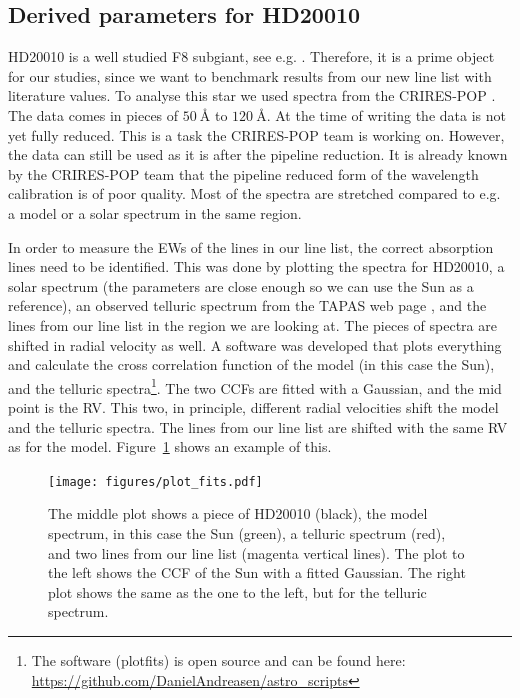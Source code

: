 \documentclass{aa}
\begin{document}
\subsection{Derived parameters for HD20010}
\label{sec:derived_parameters_of_hd20010}

HD20010 is a well studied F8 subgiant, see e.g.
\cite{Mortier2013,Lebzelter2012}. Therefore, it is a prime object for
our studies, since we want to benchmark results from our new line list
with literature values. To analyse this star we used spectra from
the CRIRES-POP \citep{Lebzelter2012}. The data comes in pieces of
$\SI{50}{\angstrom}$ to $\SI{120}{\angstrom}$. At the time of writing
the data is not yet fully reduced. This is a task the CRIRES-POP team
is working on. However, the data can still be used as it is after the
pipeline reduction. It is already known by the CRIRES-POP team that the
pipeline reduced form of the wavelength calibration is of poor quality.
Most of the spectra are stretched compared to e.g. a model or a solar
spectrum in the same region.

In order to measure the EWs of the lines in our line list, the correct
absorption lines need to be identified. This was done by plotting
the spectra for HD20010, a solar spectrum (the parameters are close
enough so we can use the Sun as a reference), an observed telluric
spectrum from the TAPAS web page \citep{Bertaux2014}, and the lines from our
line list in the region we are looking at. The pieces of spectra are
shifted in radial velocity as well. A software was developed that plots
everything and calculate the cross correlation function of the model
(in this case the Sun), and the telluric spectra\footnote{The software
(plot\textunderscore{}fits) is open source and can be found here:
\url{https://github.com/DanielAndreasen/astro_scripts}}. The two CCFs
are fitted with a Gaussian, and the mid point is the RV. This two, in
principle, different radial velocities shift the model and the telluric
spectra. The lines from our line list are shifted with the same RV as for
the model. Figure~\ref{fig:plot_fits} shows an example of this.

\begin{figure}[tbp!]
    \centering
    \texttt{[image: figures/plot\_fits.pdf]}
    \caption{The middle plot shows a piece of HD20010 (black), the model
    spectrum, in this case the Sun (green), a telluric spectrum (red), and two
    lines from our line list (magenta vertical lines). The plot to the left
    shows the CCF of the Sun with a fitted Gaussian. The right plot shows the
    same as the one to the left, but for the telluric spectrum.}
    \label{fig:plot_fits}
\end{figure}
\end{document}
